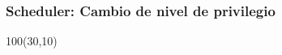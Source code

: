\documentclass[aspectratio=169]{beamer}
\begin{document}
\begin{frame}
    \frametitle{Scheduler: Cambio de nivel de privilegio}
    \begin{textblock}{100}(30,10)  \end{textblock} %
\end{frame}
\end{document}
